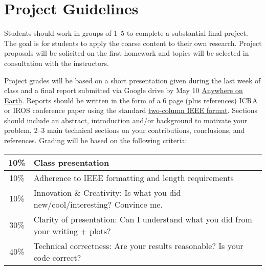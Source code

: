 \documentclass[11pt,letterpaper]{article}
\begin{document}
\section*{Project Guidelines}

Students should work in groups of 1--5 to complete a substantial final project. The goal is for students to apply the coarse content to their own research. Project proposals will be solicited on the first homework and topics will be selected in consultation with the instructors.

\medskip
\noindent
Project grades will be based on a short presentation given during the last week of class and a final report submitted via Google drive by May 10 \href{https://time.is/Anywhere_on_Earth}{Anywhere on Earth}. Reports should be written in the form of a 6 page (plus references) ICRA or IROS conference paper using the standard \href{https://www.ieee.org/conferences/publishing/templates.html}{two-column IEEE format}. Sections should include an abstract, introduction and/or background to motivate your problem, 2--3 main technical sections on your contributions, conclusions, and references. Grading will be based on the following criteria:
\newline
\newline
\begin{tabular}{|c|l|}
\hline
10\% & Class presentation \\
\hline
10\% & Adherence to IEEE formatting and length requirements \\
\hline
10\% & Innovation \& Creativity: Is what you did new/cool/interesting? Convince me. \\
\hline
30\% & Clarity of presentation: Can I understand what you did from your writing + plots? \\
\hline
40\% & Technical correctness: Are your results reasonable? Is your code correct? \\
\hline	
\end{tabular}
\end{document}
